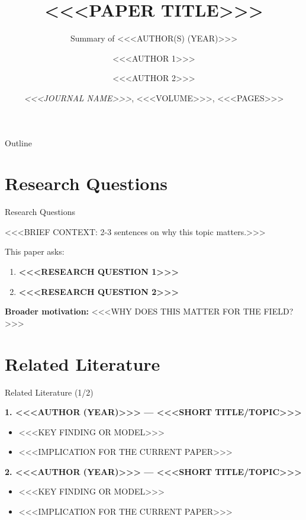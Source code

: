 \documentclass[aspectratio=169, 11pt]{beamer}
\title{<<<PAPER TITLE>>>}
\subtitle{Summary of <<<AUTHOR(S) (YEAR)>>>}
\author{<<<AUTHOR 1>>> \and <<<AUTHOR 2>>>}
\institute{<<<INSTITUTION 1>>> \and <<<INSTITUTION 2>>>}
\date{\textit{<<<JOURNAL NAME>>>}, <<<VOLUME>>>, <<<PAGES>>>}
\begin{document}
\begin{frame}
  \titlepage
\end{frame}

\begin{frame}{Outline}
  \tableofcontents
\end{frame}

\section{Research Questions}

\begin{frame}{Research Questions}

<<<BRIEF CONTEXT: 2-3 sentences on why this topic matters.>>>

\bigskip
This paper asks:
\begin{enumerate}
  \item \textbf{<<<RESEARCH QUESTION 1>>>}
  \item \textbf{<<<RESEARCH QUESTION 2>>>}
\end{enumerate}

\bigskip
\textbf{Broader motivation:} <<<WHY DOES THIS MATTER FOR THE FIELD?>>>

\end{frame}

\section{Related Literature}

\begin{frame}{Related Literature (1/2)}

\textbf{1. <<<AUTHOR (YEAR)>>> --- <<<SHORT TITLE/TOPIC>>>}
\begin{itemize}
  \item <<<KEY FINDING OR MODEL>>>
  \item <<<IMPLICATION FOR THE CURRENT PAPER>>>
\end{itemize}

\bigskip
\textbf{2. <<<AUTHOR (YEAR)>>> --- <<<SHORT TITLE/TOPIC>>>}
\begin{itemize}
  \item <<<KEY FINDING OR MODEL>>>
  \item <<<IMPLICATION FOR THE CURRENT PAPER>>>
\end{itemize}

\end{frame}
\end{document}
